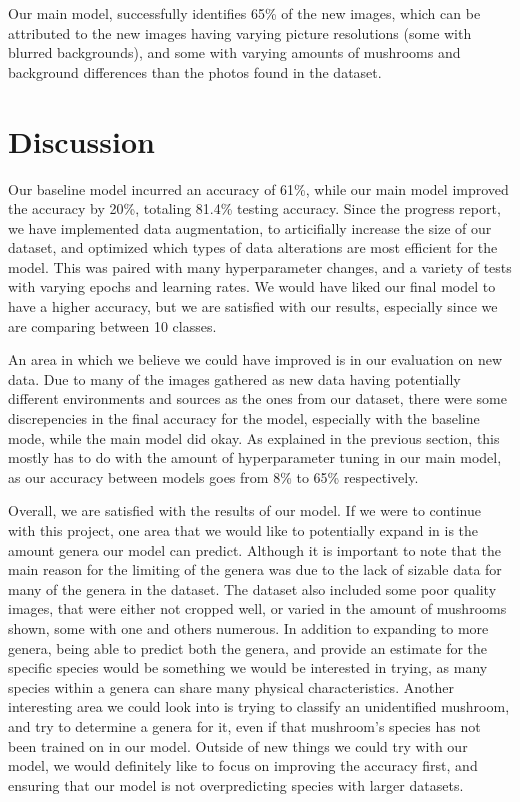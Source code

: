 \documentclass{article} %
\begin{document}
Our main model, successfully identifies 65\% of the new images, which can be attributed to the new images having varying picture resolutions (some with blurred backgrounds), and some with varying amounts of mushrooms and background differences than the photos found in the dataset.

\section{Discussion}
\label{sec:discussion}

Our baseline model incurred an accuracy of 61\%, while our main model improved the accuracy by 20\%, totaling 81.4\% testing accuracy. Since the progress report, we have implemented data augmentation, to articifially increase the size of our dataset, and optimized which types of data alterations are most efficient for the model. This was paired with many hyperparameter changes, and a variety of tests with varying epochs and learning rates. We would have liked our final model to have a higher accuracy, but we are satisfied with our results, especially since we are comparing between 10 classes.

An area in which we believe we could have improved is in our evaluation on new data. Due to many of the images gathered as new data having potentially different environments and sources as the ones from our dataset, there were some discrepencies in the final accuracy for the model, especially with the baseline mode, while the main model did okay. As explained in the previous section, this mostly has to do with the amount of hyperparameter tuning in our main model, as our accuracy between models goes from 8\% to 65\% respectively. 

Overall, we are satisfied with the results of our model. If we were to continue with this project, one area that we would like to potentially expand in is the amount genera our model can predict. Although it is important to note that the main reason for the limiting of the genera was due to the lack of sizable data for many of the genera in the dataset. The dataset also included some poor quality images, that were either not cropped well, or varied in the amount of mushrooms shown, some with one and others numerous. In addition to expanding to more genera, being able to predict both the genera, and provide an estimate for the specific species would be something we would be interested in trying, as many species within a genera can share many physical characteristics. Another interesting area we could look into is trying to classify an unidentified mushroom, and try to determine a genera for it, even if that mushroom's species has not been trained on in our model. Outside of new things we could try with our model, we would definitely like to focus on improving the accuracy first, and ensuring that our model is not overpredicting species with larger datasets. 
\end{document}
